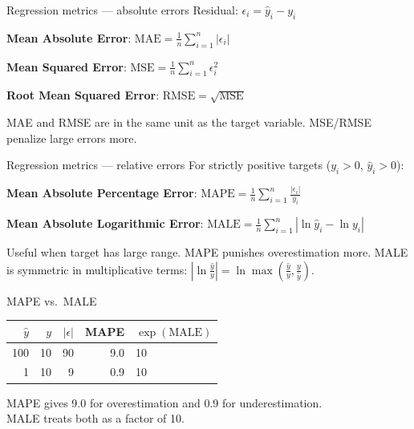 \begin{frame}{Regression metrics --- absolute errors}
  Residual: $\epsilon_i = \hat{y}_i - y_i$

  \vspace{0.3cm}
  \textbf{Mean Absolute Error}:
  $\displaystyle\text{MAE} = \frac{1}{n} \sum_{i=1}^n |\epsilon_i|$

  \vspace{0.3cm}
  \textbf{Mean Squared Error}:
  $\displaystyle\text{MSE} = \frac{1}{n} \sum_{i=1}^n \epsilon_i^2$

  \vspace{0.3cm}
  \textbf{Root Mean Squared Error}:
  $\text{RMSE} = \sqrt{\text{MSE}}$

  \vspace{0.3cm}
  \small MAE and RMSE are in the same unit as the target variable.
  MSE/RMSE penalize large errors more.
\end{frame}

\begin{frame}{Regression metrics --- relative errors}
  For strictly positive targets ($y_i > 0$, $\hat{y}_i > 0$):

  \vspace{0.3cm}
  \textbf{Mean Absolute Percentage Error}:
  $\displaystyle\text{MAPE} = \frac{1}{n} \sum_{i=1}^n \frac{|\epsilon_i|}{y_i}$

  \vspace{0.3cm}
  \textbf{Mean Absolute Logarithmic Error}:
  $\displaystyle\text{MALE} = \frac{1}{n} \sum_{i=1}^n
    |\ln\hat{y}_i - \ln y_i|$

  \vspace{0.3cm}
  \small
  Useful when target has large range. MAPE punishes overestimation more.
  MALE is symmetric in multiplicative terms:
  $|\ln\frac{\hat{y}}{y}| = \ln\max\!\left(\frac{\hat{y}}{y},
  \frac{y}{\hat{y}}\right)$.
\end{frame}

\begin{frame}{MAPE vs.\ MALE}
  \centering
  \begin{tabular}{rrrrl}
    \toprule
    $\hat{y}$ & $y$ & $|\epsilon|$ & MAPE & $\exp(\text{MALE})$ \\
    \midrule
    100 & 10 & 90 & 9.0 & 10 \\
      1 & 10 &  9 & 0.9 & 10 \\
    \bottomrule
  \end{tabular}

  \vspace{0.5cm}
  \raggedright
  MAPE gives 9.0 for overestimation and 0.9 for underestimation.\\
  MALE treats both as a factor of 10.
\end{frame}

